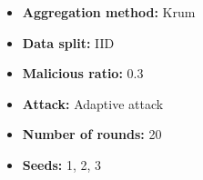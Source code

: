 \documentclass[a4j,twocolumn,dvipdfmx]{jsarticle}
\begin{document}
\begin{itemize}
    \item \textbf{Aggregation method:} Krum
    \item \textbf{Data split:} IID
    \item \textbf{Malicious ratio:} 0.3
    \item \textbf{Attack:} Adaptive attack
    \item \textbf{Number of rounds:} 20
    \item \textbf{Seeds:} 1, 2, 3
\end{itemize}


\begin{table}[H]
\centering

\caption{Krum（IID，悪性クライアント比率 0.3）における
Accuracy および Loss}

\label{tab:krum_iid_ratio0.3}

\footnotesize
\setlength{\tabcolsep}{2.5pt}
\renewcommand{\arraystretch}{0.90}

\end{table}
\end{document}
